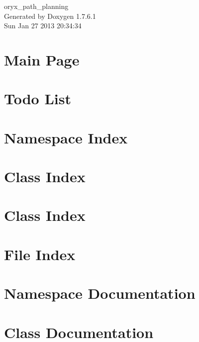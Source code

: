 \documentclass[a4paper]{book}
\begin{document}
\begin{titlepage}
\vspace*{7cm}
\begin{center}
{\Large oryx\-\_\-path\-\_\-planning }\\
\vspace*{1cm}
{\large \-Generated by Doxygen 1.7.6.1}\\
\vspace*{0.5cm}
{\small Sun Jan 27 2013 20:34:34}\\
\end{center}
\end{titlepage}
\clearemptydoublepage
{}
\tableofcontents
\clearemptydoublepage
{}
\chapter{\-Main \-Page}
\label{index}
\chapter{\-Todo \-List}
\label{todo}

\chapter{\-Namespace \-Index}

\chapter{\-Class \-Index}

\chapter{\-Class \-Index}

\chapter{\-File \-Index}

\chapter{\-Namespace \-Documentation}


\chapter{\-Class \-Documentation}














\end{document}
